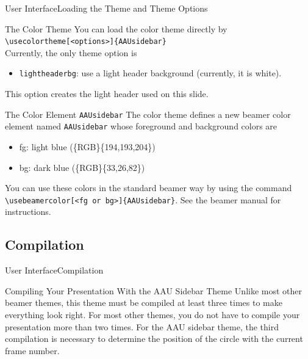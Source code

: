 \documentclass[10pt]{beamer}
\begin{document}
{
\begin{frame}{User Interface}{Loading the Theme and Theme Options}
  \begin{block}{The Color Theme}
    You can load the color theme directly by\\
    {\tt \textbackslash usecolortheme[<options>]\{AAUsidebar\}}\\
    Currently, the only theme option is
    \begin{itemize}
      \item {\tt lightheaderbg}: use a light header background (currently, it is white). 
    \end{itemize}
    This option creates the light header used on this slide.
  \end{block}
  \pause
  \begin{block}{The Color Element {\tt AAUsidebar}}
    The color theme defines a new beamer color element named {\tt AAUsidebar} whose foreground and background colors are
    \begin{itemize}
      \item fg: {light blue (\{RGB\}\{194,193,204\})}
      \item bg: {dark blue (\{RGB\}\{33,26,82\})}
    \end{itemize}
    You can use these colors in the standard beamer way by using the command
    {\tt \textbackslash usebeamercolor[<fg or bg>]\{AAUsidebar\}}. See the beamer manual for instructions.
  \end{block}
\end{frame}
}

\subsection{Compilation}
\begin{frame}{User Interface}{Compilation}
\begin{block}{Compiling Your Presentation With the AAU Sidebar Theme}
  Unlike most other beamer themes, this theme must be compiled at least \alert{three} times to make everything look right. For most other themes, you do not have to compile your presentation more than two times. For the AAU sidebar theme, the third compilation is necessary to determine the position of the circle with the current frame number.
\end{block}
\end{frame}
\end{document}

